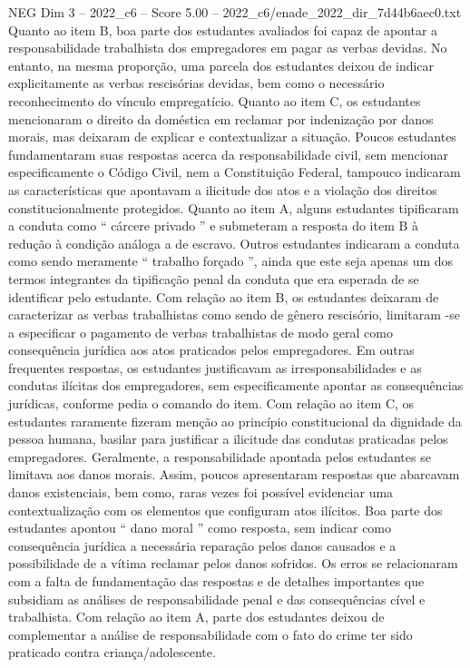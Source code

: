 \begin{textsample}{NEG Dim 3 – 2022\_c6 – Score 5.00 – 2022\_c6/enade\_2022\_dir\_7d44b6aec0.txt}
Quanto ao item B, boa parte dos estudantes avaliados foi capaz de apontar a responsabilidade trabalhista dos empregadores em pagar as verbas devidas.
No entanto, na mesma proporção, uma parcela dos estudantes deixou de indicar explicitamente as verbas rescisórias devidas, bem como o necessário reconhecimento do vínculo empregatício.
Quanto ao item C, os estudantes mencionaram o direito da doméstica em reclamar por indenização por danos morais, mas deixaram de explicar e contextualizar a situação.
Poucos estudantes fundamentaram suas respostas acerca da responsabilidade civil, sem mencionar especificamente o Código Civil, nem a Constituição Federal, tampouco indicaram as características que apontavam a ilicitude dos atos e a violação dos direitos constitucionalmente protegidos.
Quanto ao item A, alguns estudantes tipificaram a conduta como “ cárcere privado ” e submeteram a resposta do item B à redução à condição análoga a de escravo.
Outros estudantes indicaram a conduta como sendo meramente “ trabalho forçado ”, ainda que este seja apenas um dos termos integrantes da tipificação penal da conduta que era esperada de se identificar pelo estudante.
Com relação ao item B, os estudantes deixaram de caracterizar as verbas trabalhistas como sendo de gênero rescisório, limitaram -se a especificar o pagamento de verbas trabalhistas de modo geral como consequência jurídica aos atos praticados pelos empregadores.
Em outras frequentes respostas, os estudantes justificavam as irresponsabilidades e as condutas ilícitas dos empregadores, sem especificamente apontar as consequências jurídicas, conforme pedia o comando do item.
Com relação ao item C, os estudantes raramente fizeram menção ao princípio constitucional da dignidade da pessoa humana, basilar para justificar a ilicitude das condutas praticadas pelos empregadores.
Geralmente, a responsabilidade apontada pelos estudantes se limitava aos danos morais.
Assim, poucos apresentaram respostas que abarcavam danos existenciais, bem como, raras vezes foi possível evidenciar uma contextualização com os elementos que configuram atos ilícitos.
Boa parte dos estudantes apontou “ dano moral ” como resposta, sem indicar como consequência jurídica a necessária reparação pelos danos causados e a possibilidade de a vítima reclamar pelos danos sofridos.
Os erros se relacionaram com a falta de fundamentação das respostas e de detalhes importantes que subsidiam as análises de responsabilidade penal e das consequências cível e trabalhista.
Com relação ao item A, parte dos estudantes deixou de complementar a análise de responsabilidade com o fato do crime ter sido praticado contra criança/adolescente.

\end{textsample}
